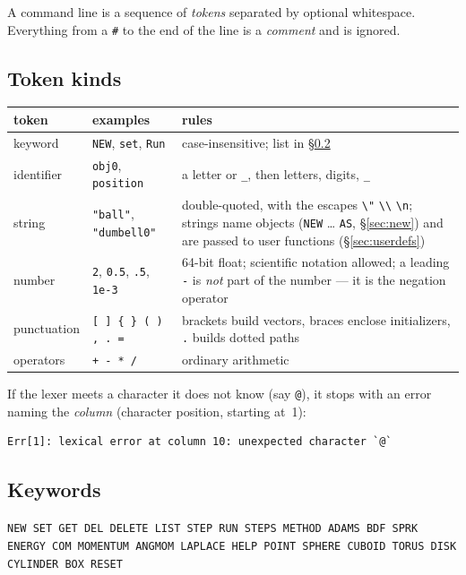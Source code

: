 \documentclass[11pt]{article}
\newcommand{\kw}[1]{\texttt{\uppercase{#1}}}
\newcommand{\code}[1]{\texttt{#1}}
\begin{document}
A command line is a sequence of \emph{tokens} separated by optional
whitespace. Everything from a \code{\#} to the end of the line is a
\emph{comment} and is ignored.

\subsection{Token kinds}

\begin{center}
\begin{tabular}{lp{4.2cm}p{6.6cm}}
\textbf{token} & \textbf{examples} & \textbf{rules}\\\hline
keyword & \code{NEW}, \code{set}, \code{Run} & case-insensitive; list in \S\ref{sec:keywords}\\
identifier & \code{obj0}, \code{position} & a letter or \code{\_}, then letters, digits, \code{\_}\\
string & \code{"ball"}, \code{"dumbell0"} & double-quoted, with the escapes \code{\textbackslash"} \code{\textbackslash\textbackslash} \code{\textbackslash n}; strings name objects (\kw{new} \ldots{} \kw{as}, \S\ref{sec:new}) and are passed to user functions (\S\ref{sec:userdefs})\\
number & \code{2}, \code{0.5}, \code{.5}, \code{1e-3} & 64-bit float; scientific notation allowed; a leading \code{-} is \emph{not} part of the number --- it is the negation operator\\
punctuation & \code{[ ] \{ \} ( ) , . =} & brackets build vectors, braces enclose initializers, \code{.} builds dotted paths\\
operators & \code{+ - * /} & ordinary arithmetic\\
\end{tabular}
\end{center}

If the lexer meets a character it does not know (say \code{@}), it stops
with an error naming the \emph{column} (character position, starting at~1):
\begin{lstlisting}
Err[1]: lexical error at column 10: unexpected character `@`
\end{lstlisting}

\subsection{Keywords}\label{sec:keywords}

\code{NEW SET GET DEL DELETE LIST STEP RUN STEPS METHOD ADAMS BDF SPRK
ENERGY COM MOMENTUM ANGMOM LAPLACE HELP POINT SPHERE CUBOID TORUS DISK
CYLINDER BOX RESET}
\end{document}

